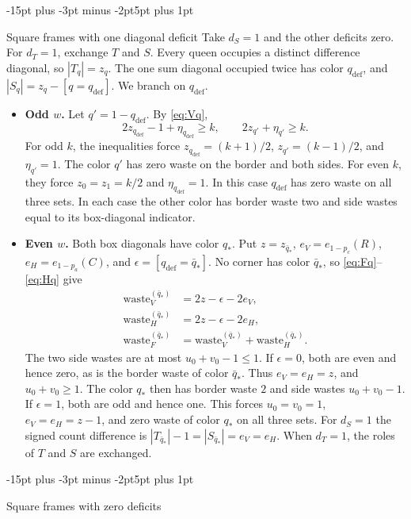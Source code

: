 \documentclass[11pt,a4paper]{article}
\makeatletter
\renewcommand{\subsection}{\@startsection{subsection}{2}{\z@}%
  {-15pt plus -3pt minus -2pt}{5pt plus 1pt}%
  {\normalfont\bfseries\raggedright}}
\theoremstyle{result}
\theoremstyle{definition}
\theoremstyle{remark}
\newcommand{\waste}{\mathrm{waste}}
\makeatother
\begin{document}
\subsection{Square frames with one diagonal deficit}
Take $d_S=1$ and the other deficits zero. For $d_T=1$, exchange
$T$ and $S$. Every queen occupies a distinct difference diagonal,
so $|T_q|=z_q$. The one sum diagonal occupied twice has color
$q_{\mathrm{def}}$, and $|S_q|=z_q-[q=q_{\mathrm{def}}]$.
We branch on $q_{\mathrm{def}}$.
\begin{itemize}[leftmargin=1.8em,itemsep=3pt]
  \item \textbf{Odd $w$.} Let $q'=1-q_{\mathrm{def}}$. By \eqref{eq:Vq},
    \[
      2z_{q_{\mathrm{def}}}-1+\eta_{q_{\mathrm{def}}}\ge k,\qquad
      2z_{q'}+\eta_{q'}\ge k .
    \]
    For odd $k$, the inequalities force
    $z_{q_{\mathrm{def}}}=(k+1)/2$, $z_{q'}=(k-1)/2$, and $\eta_{q'}=1$.
    The color $q'$ has zero waste on the border and both sides.
    For even $k$, they force $z_0=z_1=k/2$ and $\eta_{q_{\mathrm{def}}}=1$.
    In this case $q_{\mathrm{def}}$ has zero waste on all three sets.
    In each case the other color has border waste two and side
    wastes equal to its box-diagonal indicator.
  \item \textbf{Even $w$.} Both box diagonals have color $q_*$. Put $z=z_{\bar q_*}$,
  $e_V=e_{1-p_c}(R)$, $e_H=e_{1-p_a}(C)$, and
  $\epsilon=[q_{\mathrm{def}}=\bar q_*]$. No corner has color $\bar q_*$,
  so \eqref{eq:Fq}--\eqref{eq:Hq} give
  \begin{align*}
    \waste_V^{(\bar q_*)}&=2z-\epsilon-2e_V,\\
    \waste_H^{(\bar q_*)}&=2z-\epsilon-2e_H,\\
    \waste_F^{(\bar q_*)}&=\waste_V^{(\bar q_*)}+\waste_H^{(\bar q_*)}.
  \end{align*}
  The two side wastes are at most $u_0+v_0-1\le1$.
  If $\epsilon=0$, both are even and hence zero, as is the border waste
  of color $\bar q_*$. Thus $e_V=e_H=z$, and $u_0+v_0\ge1$.
  The color $q_*$ then has border waste $2$ and side wastes
  $u_0+v_0-1$.
  If $\epsilon=1$, both are odd and hence one. This forces
  $u_0=v_0=1$, $e_V=e_H=z-1$, and zero waste of color $q_*$ on all
  three sets. For $d_S=1$ the signed count difference is
  $|T_{\bar q_*}|-1=|S_{\bar q_*}|=e_V=e_H$.
  When $d_T=1$, the roles of $T$ and $S$ are exchanged.
\end{itemize}

\subsection{Square frames with zero deficits}\label{sec:sq0}
\end{document}
